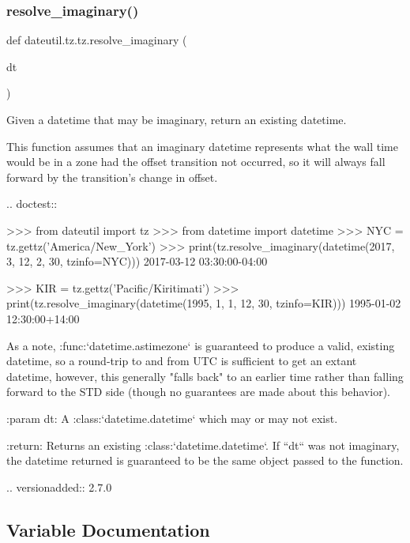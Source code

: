 \subsubsection{\texorpdfstring{resolve\+\_\+imaginary()}{resolve\_imaginary()}}
{\footnotesize\ttfamily def dateutil.\+tz.\+tz.\+resolve\+\_\+imaginary (\begin{DoxyParamCaption}\item[{}]{dt }\end{DoxyParamCaption})}

\begin{DoxyVerb}Given a datetime that may be imaginary, return an existing datetime.

This function assumes that an imaginary datetime represents what the
wall time would be in a zone had the offset transition not occurred, so
it will always fall forward by the transition's change in offset.

.. doctest::

    >>> from dateutil import tz
    >>> from datetime import datetime
    >>> NYC = tz.gettz('America/New_York')
    >>> print(tz.resolve_imaginary(datetime(2017, 3, 12, 2, 30, tzinfo=NYC)))
    2017-03-12 03:30:00-04:00

    >>> KIR = tz.gettz('Pacific/Kiritimati')
    >>> print(tz.resolve_imaginary(datetime(1995, 1, 1, 12, 30, tzinfo=KIR)))
    1995-01-02 12:30:00+14:00

As a note, :func:`datetime.astimezone` is guaranteed to produce a valid,
existing datetime, so a round-trip to and from UTC is sufficient to get
an extant datetime, however, this generally "falls back" to an earlier time
rather than falling forward to the STD side (though no guarantees are made
about this behavior).

:param dt:
    A :class:`datetime.datetime` which may or may not exist.

:return:
    Returns an existing :class:`datetime.datetime`. If ``dt`` was not
    imaginary, the datetime returned is guaranteed to be the same object
    passed to the function.

.. versionadded:: 2.7.0
\end{DoxyVerb}
 

\subsection{Variable Documentation}
\mbox{\label{namespacedateutil_1_1tz_1_1tz_a7c010e6056d7ef2b13139b46f4876d17}} 
